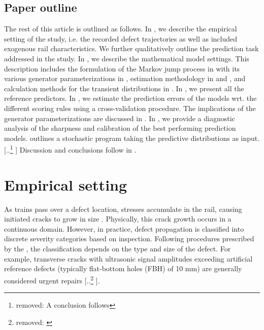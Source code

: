 \documentclass{article}
\providecommand{\DIFadd}[1]{{\protect\color{blue} \sf #1}} %
\providecommand{\DIFdel}[1]{{\protect\color{red} [..\footnote{removed: #1} ]}} %
\providecommand{\DIFaddbegin}{} %
\providecommand{\DIFaddend}{} %
\providecommand{\DIFdelbegin}{} %
\providecommand{\DIFdelend}{} %
\begin{document}
\subsection{Paper outline}
The rest of this article is outlined as follows. In , we describe the empirical setting of the study, i.e. the recorded defect trajectories as well as included exogenous rail characteristics. We further qualitatively outline the prediction task addressed in the study. In , we describe the mathematical model settings. This description includes the formulation of the Markov jump process in  with its various generator parameterizations in , estimation methodology in  and , and calculation methods for the transient distributions in . In , we present all the reference predictors. In , we estimate the prediction errors of the models wrt. the different scoring rules using a cross-validation procedure. The implications of the generator parameterizations are discussed in . In , we provide a diagnostic analysis of the sharpness and calibration of the best performing prediction models.  outlines a stochastic program taking the predictive distributions as input. \DIFdelbegin \DIFdel{A conclusion follows }\DIFdelend \DIFaddbegin \DIFadd{Discussion and conclusions follow }\DIFaddend in . 


\section{Empirical setting} \label{sec:data}
As trains pass over a defect location, stresses accumulate in the rail, causing initiated cracks to grow in size \citep{cannon2003a}. Physically, this crack growth occurs in a continuous domain. However, in practice, defect propagation is classified into discrete severity categories based on inspection. Following procedures prescribed by the \citet{UIC_2002_defecthandbook}, the classification depends on the type and size of the defect. For example, transverse cracks with ultrasonic signal amplitudes exceeding artificial reference defects (typically flat-bottom holes (FBH) of 10 mm) are generally considered urgent repairs\DIFdelbegin \DIFdel{\citep{banenor_technical_regulations}}\DIFdelend . 
\end{document}
